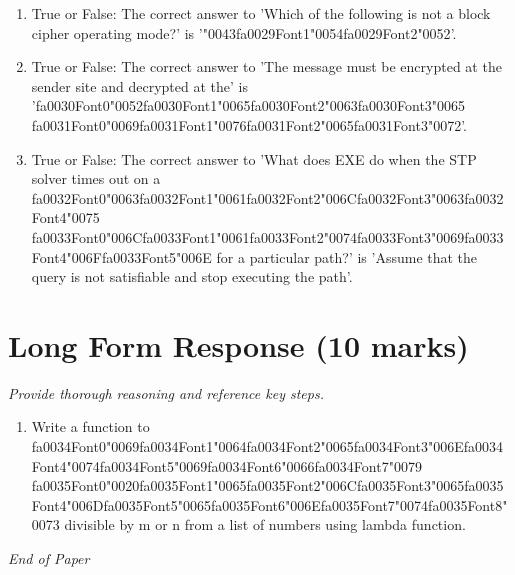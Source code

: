 \documentclass[12pt]{article}
\begin{document}
\begin{enumerate}[label=\arabic*.]
\item True or False: The correct answer to 'Which of the following is not a block cipher operating mode?' is '{\char"0043}{\csname fa0029Font1\endcsname\char"0054}{\csname fa0029Font2\endcsname\char"0052}'.
\item True or False: The correct answer to 'The message must be encrypted at the sender site and decrypted at the' is '{\csname fa0030Font0\endcsname\char"0052}{\csname fa0030Font1\endcsname\char"0065}{\csname fa0030Font2\endcsname\char"0063}{\csname fa0030Font3\endcsname\char"0065} {\csname fa0031Font0\endcsname\char"0069}{\csname fa0031Font1\endcsname\char"0076}{\csname fa0031Font2\endcsname\char"0065}{\csname fa0031Font3\endcsname\char"0072}'.
\item True or False: The correct answer to 'What does EXE do when the STP solver times out on a {\csname fa0032Font0\endcsname\char"0063}{\csname fa0032Font1\endcsname\char"0061}{\csname fa0032Font2\endcsname\char"006C}{\csname fa0032Font3\endcsname\char"0063}{\csname fa0032Font4\endcsname\char"0075} {\csname fa0033Font0\endcsname\char"006C}{\csname fa0033Font1\endcsname\char"0061}{\csname fa0033Font2\endcsname\char"0074}{\csname fa0033Font3\endcsname\char"0069}{\csname fa0033Font4\endcsname\char"006F}{\csname fa0033Font5\endcsname\char"006E} for a particular path?' is 'Assume that the query is not satisfiable and stop executing the path'.
\end{enumerate}

\section*{Long Form Response (10 marks)}
\textit{Provide thorough reasoning and reference key steps.}
\begin{enumerate}[label=\arabic*.]
\item Write a function to {\csname fa0034Font0\endcsname\char"0069}{\csname fa0034Font1\endcsname\char"0064}{\csname fa0034Font2\endcsname\char"0065}{\csname fa0034Font3\endcsname\char"006E}{\csname fa0034Font4\endcsname\char"0074}{\csname fa0034Font5\endcsname\char"0069}{\csname fa0034Font6\endcsname\char"0066}{\csname fa0034Font7\endcsname\char"0079} {\csname fa0035Font0\endcsname\char"0020}{\csname fa0035Font1\endcsname\char"0065}{\csname fa0035Font2\endcsname\char"006C}{\csname fa0035Font3\endcsname\char"0065}{\csname fa0035Font4\endcsname\char"006D}{\csname fa0035Font5\endcsname\char"0065}{\csname fa0035Font6\endcsname\char"006E}{\csname fa0035Font7\endcsname\char"0074}{\csname fa0035Font8\endcsname\char"0073} divisible by m or n from a list of numbers using lambda
function.
\end{enumerate}

\vfill
\noindent\textit{End of Paper}
\end{document}

